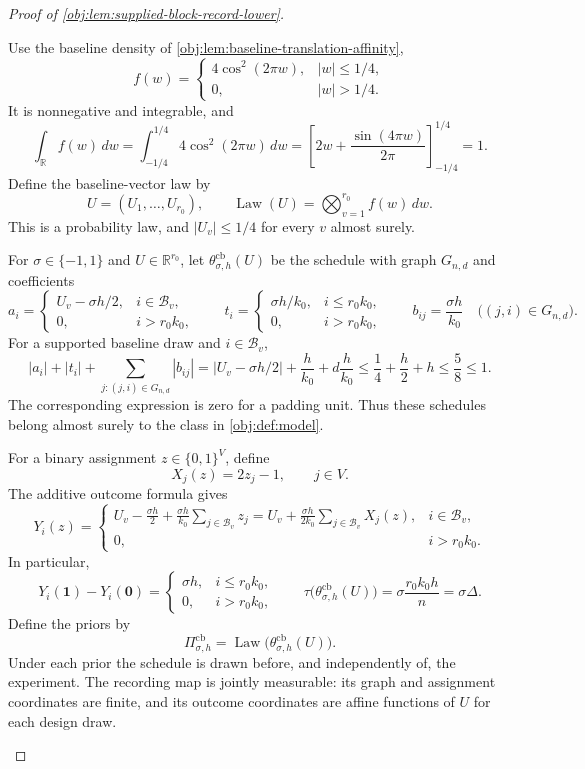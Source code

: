 \begin{proof}[Proof of \cref{obj:lem:supplied-block-record-lower}]
\begin{enumerate}
Use the baseline density of \cref{obj:lem:baseline-translation-affinity},
\[
f(w)=
\begin{cases}
4\cos^2(2\pi w),& |w|\le1/4,\\
0,& |w|>1/4.
\end{cases}
\]
It is nonnegative and integrable, and
\[
\int_{\mathbb R}f(w)\,dw
=
\int_{-1/4}^{1/4}4\cos^2(2\pi w)\,dw
=
\left[2w+\frac{\sin(4\pi w)}{2\pi}\right]_{-1/4}^{1/4}
=1.
\]
Define the baseline-vector law by
\[
U=(U_1,\ldots,U_{r_0}),
\qquad
\operatorname{Law}(U)=\bigotimes_{v=1}^{r_0}f(w)\,dw.
\]
This is a probability law, and \(|U_v|\le1/4\) for every \(v\) almost surely.

For \(\sigma\in\{-1,1\}\) and \(U\in\mathbb R^{r_0}\), let
\(\theta^{\mathrm{cb}}_{\sigma,h}(U)\) be the schedule with graph \(G_{n,d}\) and coefficients
\[
a_i=
\begin{cases}
U_v-\sigma h/2,&i\in\mathcal B_v,\\
0,&i>r_0k_0,
\end{cases}
\qquad
t_i=
\begin{cases}
\sigma h/k_0,&i\le r_0k_0,\\
0,&i>r_0k_0,
\end{cases}
\qquad
b_{ij}=\frac{\sigma h}{k_0}
\quad\bigl((j,i)\in G_{n,d}\bigr).
\]
For a supported baseline draw and \(i\in\mathcal B_v\),
\[
|a_i|+|t_i|+\sum_{j:(j,i)\in G_{n,d}}|b_{ij}|
=
|U_v-\sigma h/2|+\frac{h}{k_0}
+d\frac{h}{k_0}
\le\frac14+\frac h2+h
\le\frac58\le1.
\]
The corresponding expression is zero for a padding unit. Thus these schedules belong almost surely to the class in \cref{obj:def:model}.

For a binary assignment \(z\in\{0,1\}^{V}\), define
\[
X_j(z)=2z_j-1,
\qquad j\in V.
\]
The additive outcome formula gives
\[
Y_i(z)=
\begin{cases}
\displaystyle
U_v-\frac{\sigma h}{2}
+\frac{\sigma h}{k_0}\sum_{j\in\mathcal B_v}z_j
=
U_v+\frac{\sigma h}{2k_0}
\sum_{j\in\mathcal B_v}X_j(z),
&i\in\mathcal B_v,\\[6pt]
0,&i>r_0k_0.
\end{cases}
\]
In particular,
\[
Y_i(\mathbf1)-Y_i(\mathbf0)=
\begin{cases}
\sigma h,&i\le r_0k_0,\\
0,&i>r_0k_0,
\end{cases}
\qquad
\tau\bigl(\theta^{\mathrm{cb}}_{\sigma,h}(U)\bigr)
=
\sigma\frac{r_0k_0h}{n}
=\sigma\Delta.
\]
Define the priors by
\[
\Pi^{\mathrm{cb}}_{\sigma,h}
=
\operatorname{Law}\bigl(\theta^{\mathrm{cb}}_{\sigma,h}(U)\bigr).
\]
Under each prior the schedule is drawn before, and independently of, the experiment. The recording map is jointly measurable: its graph and assignment coordinates are finite, and its outcome coordinates are affine functions of \(U\) for each design draw.


\end{enumerate}
\end{proof}

